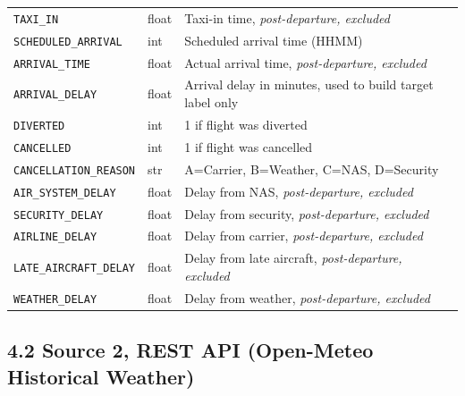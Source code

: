 \documentclass{article}
\newcommand{\code}[1]{\texttt{\small #1}}
\begin{document}
\begin{tcolorbox}[mainbox, title={BTS Feature Descriptions}]
\begin{longtable}{L{4cm} L{1.8cm} p{7.5cm}}
    \code{TAXI\_IN}              & float & Taxi-in time, \textit{post-departure, excluded} \\
    \code{SCHEDULED\_ARRIVAL}    & int   & Scheduled arrival time (HHMM) \\
    \code{ARRIVAL\_TIME}         & float & Actual arrival time, \textit{post-departure, excluded} \\
    \code{ARRIVAL\_DELAY}        & float & Arrival delay in minutes, used to build target label only \\
    \code{DIVERTED}              & int   & 1 if flight was diverted \\
    \code{CANCELLED}             & int   & 1 if flight was cancelled \\
    \code{CANCELLATION\_REASON}  & str   & A=Carrier, B=Weather, C=NAS, D=Security \\
    \code{AIR\_SYSTEM\_DELAY}    & float & Delay from NAS, \textit{post-departure, excluded} \\
    \code{SECURITY\_DELAY}       & float & Delay from security, \textit{post-departure, excluded} \\
    \code{AIRLINE\_DELAY}        & float & Delay from carrier, \textit{post-departure, excluded} \\
    \code{LATE\_AIRCRAFT\_DELAY} & float & Delay from late aircraft, \textit{post-departure, excluded} \\
    \code{WEATHER\_DELAY}        & float & Delay from weather, \textit{post-departure, excluded} \\
    \bottomrule
\end{longtable}
\end{tcolorbox}

\subsection*{\textcolor{accentgold}{4.2 Source 2, REST API (Open-Meteo Historical Weather)}}
\end{document}
